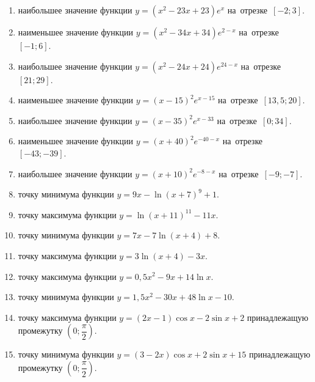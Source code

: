 \documentclass[a4paper,10pt]{article}
\begin{document}
\begin{enumerate}
\item {} наибольшее значение функции $y=\left(x^2 -23x +23\right)e^{x}$ на~отрезке~$\left[-2;3\right]$.

\item {} наименьшее значение функции $y=\left(x^2 -34x +34\right)e^{2-x}$ на~отрезке~$\left[-1;6\right]$.

\item {} наибольшее значение функции $y=\left(x^2 -24x +24\right)e^{24-x}$ на~отрезке~$\left[21;29\right]$.

\item {} наименьшее значение функции $y=\left(x-15\right)^2e^{x-15}$ на~отрезке~$\left[13,5;20\right]$.

\item {} наибольшее значение функции $y=\left(x-35\right)^2e^{x-33}$ на~отрезке~$\left[0;34\right]$.

\item {} наименьшее значение функции $y=\left(x+40\right)^2e^{-40-x}$ на~отрезке~$\left[-43;-39\right]$.

\item {} наибольшее значение функции $y=\left(x+10\right)^2e^{-8-x}$ на~отрезке~$\left[-9;-7\right]$.

\item {} точку минимума функции $y=9x-\ln\left(x+7\right)^{9}+1$.

\item {} точку максимума функции $y=\ln\left(x+11\right)^{11}-11x$.

\item {} точку минимума функции $y=7x-7\ln\left(x+4\right)+8$.

\item {} точку максимума функции $y=3\ln\left(x+4\right)-3x$.

\item {} точку максимума функции $y=0,5x^2-9x+14\ln x $.

\item {} точку минимума функции $y=1,5x^2-30x+48\ln x -10$.

\item {} точку максимума функции $y=\left(2x-1\right)\cos x -2\sin x+2$
принадлежащую промежутку $\left(0;\dfrac{\pi}{2}\right)$.

\item {} точку минимума функции $y=\left(3-2x\right)\cos x +2\sin x+15$
принадлежащую промежутку $\left(0;\dfrac{\pi}{2}\right)$.


\end{enumerate}
\end{document}
